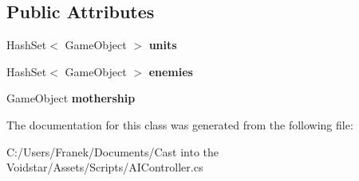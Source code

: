 \subsection*{Public Attributes}
\begin{DoxyCompactItemize}
\item 
\hypertarget{class_a_i_controller_a4b8a5c97c0fb6cf61eec392547a3514f}{}Hash\+Set$<$ Game\+Object $>$ {\bfseries units}\label{class_a_i_controller_a4b8a5c97c0fb6cf61eec392547a3514f}

\item 
\hypertarget{class_a_i_controller_a94a988b0c68154f5437c3254e229ec8c}{}Hash\+Set$<$ Game\+Object $>$ {\bfseries enemies}\label{class_a_i_controller_a94a988b0c68154f5437c3254e229ec8c}

\item 
\hypertarget{class_a_i_controller_ae6e9e675c8cfa60e56721cb0da4010bf}{}Game\+Object {\bfseries mothership}\label{class_a_i_controller_ae6e9e675c8cfa60e56721cb0da4010bf}

\end{DoxyCompactItemize}


The documentation for this class was generated from the following file\+:\begin{DoxyCompactItemize}
\item 
C\+:/\+Users/\+Franek/\+Documents/\+Cast into the Voidstar/\+Assets/\+Scripts/A\+I\+Controller.\+cs\end{DoxyCompactItemize}
